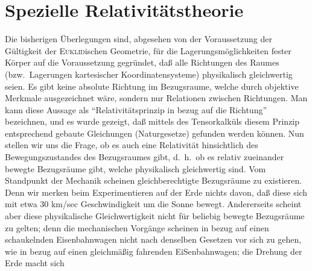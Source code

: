 %
%

\section{Spezielle Relativitätstheorie}
\label{sec:spe-1}

Die bisherigen Überlegungen sind, abgesehen von der Voraussetzung der Gültigkeit der \textsc{Euklid}ischen Geometrie, für die Lagerungsmöglichkeiten fester Körper auf die Voraussetzung gegründet, daß alle Richtungen des Raumes (bzw.\ Lagerungen kartesischer Koordinatensysteme) physikalisch gleichwertig seien. Es gibt keine absolute Richtung im Bezugsraume, welche durch objektive Merkmale ausgezeichnet wäre, sondern nur Relationen zwischen Richtungen. Man kann diese Aussage als \enquote{Relativitätsprinzip in bezug auf die Richtung} bezeichnen, und es wurde gezeigt, daß mittels des Tensorkalküls diesem Prinzip entsprechend gebaute Gleichungen (Naturgesetze) gefunden werden können. Nun stellen wir uns die Frage, ob es auch eine Relativität hinsichtlich des Bewegungszustandes des Bezugsraumes gibt, d.\ h.\ ob es relativ zueinander bewegte Bezugsräume gibt, welche physikalisch gleichwertig sind. Vom Standpunkt der Mechanik scheinen gleichberechtigte Bezugsräume zu existieren. Denn wir merken beim Experimentieren auf der Erde nichts davon, daß diese sich mit etwa 30 km/sec Geschwindigkeit um die Sonne bewegt. Andererseits scheint aber diese physikalische Gleichwertigkeit nicht für beliebig bewegte Bezugsräume zu gelten; denn die mechanischen Vorgänge scheinen in bezug auf einen schaukelnden Eisenbahnwagen nicht nach denselben Gesetzen vor sich zu gehen, wie in bezug auf einen gleichmäßig fahrenden EiSenbahnwagen; die Drehung der Erde macht sich
